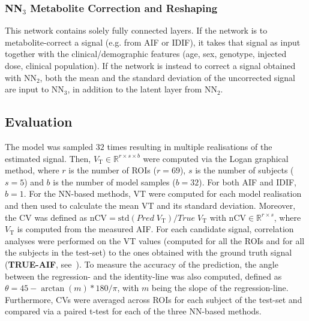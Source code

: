         \subsubsection{\gls{NN}$_3$ Metabolite Correction and Reshaping} \label{sec:NN3}
            This network contains solely fully connected layers. If the network is to metabolite-correct a signal (e.g. from \gls{AIF} or \gls{IDIF}), it takes that signal as input together with the clinical/demographic features (age, sex, genotype, injected dose, clinical population).  If the network is instead to correct a signal obtained with \gls{NN}$_2$, both the mean and the standard deviation of the uncorrected signal are input to \gls{NN}$_3$, in addition to the latent layer from \gls{NN}$_2$.

    \vspace{-0.5cm}
    
    \subsection{Evaluation}\label{sec:evaluation}        
        The model was sampled $32$ times resulting in multiple realisations of the estimated signal. Then, $V_{\mathrm{T}} \in \mathbb{R}^{r \times s \times b}$ were computed via the Logan graphical method, where $r$ is the number of \glspl{ROI} ($r = 69$), $s$ is the number of subjects ($s = 5$) and $b$ is the number of model samples ($b = 32$). For both \gls{AIF} and \gls{IDIF}, $b=1$. For the \gls{NN}-based methods, \gls{VT} were computed for each model realisation and then used to calculate the mean \gls{VT} and its standard deviation. Moreover, the \gls{CV} was defined as $\mathrm{nCV} = \mathrm{std} (Pred \; V_{\mathrm{T}}) / True \; V_{\mathrm{T}}$ with $\mathrm{nCV} \in \mathbb{R}^{r \times s}$, where $V_{\mathrm{T}}$ is computed from the measured \gls{AIF}. For each candidate signal, correlation analyses were performed on the \gls{VT} values (computed for all the \glspl{ROI} and for all the subjects in the test-set) to the ones obtained with the ground truth signal (\textbf{TRUE-\gls{AIF}}, see~). To measure the accuracy of the prediction, the angle between the regression- and the identity-line was also computed, defined as $\theta = 45 - \arctan(m)*180/\pi$, with $m$ being the slope of the regression-line. Furthermore, \glspl{CV} were averaged across \glspl{ROI} for each subject of the test-set and compared via a paired t-test for each of the three \gls{NN}-based methods.
       
